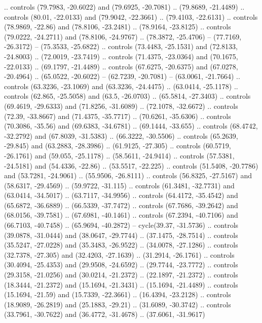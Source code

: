{  .. controls (79.7983, -20.6022) and (79.6925, -20.7081) .. (79.8689, -21.4489)
  .. controls (80.01, -22.0133) and (79.9042, -22.3661) .. (79.4103, -22.6131)
  .. controls (78.9869, -22.86) and (78.8106, -23.2481) .. (78.9164, -23.8125)
  .. controls (79.0222, -24.2711) and (78.8106, -24.9767) .. (78.3872, -25.4706)
  -- (77.7169, -26.3172)
  -- (75.3533, -25.6822)
  .. controls (73.4483, -25.1531) and (72.8133, -24.8003) .. (72.0019, -23.7419)
  .. controls (71.4375, -23.0364) and (70.1675, -22.0133) .. (69.1797, -21.4489)
  .. controls (67.6275, -20.6375) and (67.0278, -20.4964) .. (65.0522, -20.6022)
  -- (62.7239, -20.7081)
  -- (63.0061, -21.7664)
  .. controls (63.3236, -23.1069) and (63.3236, -24.4475) .. (63.0414, -25.1178)
  .. controls (62.865, -25.5058) and (63.5, -26.0703) .. (65.5814, -27.3403)
  .. controls (69.4619, -29.6333) and (71.8256, -31.6089) .. (72.1078, -32.6672)
  .. controls (72.39, -33.8667) and (71.4375, -35.7717) .. (70.6261, -35.6306)
  .. controls (70.3086, -35.56) and (69.6383, -34.6781) .. (69.1444, -33.655)
  .. controls (68.4742, -32.2792) and (67.8039, -31.5383) .. (66.3222, -30.5506)
  .. controls (65.2639, -29.845) and (63.2883, -28.3986) .. (61.9125, -27.305)
  .. controls (60.5719, -26.1761) and (59.055, -25.1178) .. (58.5611, -24.9414)
  .. controls (57.5381, -24.5181) and (54.4336, -22.86) .. (53.5517, -22.225)
  .. controls (51.5408, -20.7786) and (53.7281, -24.9061) .. (55.9506, -26.8111)
  .. controls (56.8325, -27.5167) and (58.6317, -29.4569) .. (59.9722, -31.115)
  .. controls (61.3481, -32.7731) and (63.0414, -34.5017) .. (63.7117, -34.9956)
  .. controls (64.4172, -35.4542) and (65.6872, -36.6889) .. (66.5339, -37.7472)
  .. controls (67.7686, -39.2642) and (68.0156, -39.7581) .. (67.6981, -40.1461)
  .. controls (67.2394, -40.7106) and (66.7103, -40.7458) .. (65.9694, -40.2872)
  -- cycle(39.37, -31.5736)
  .. controls (39.0878, -31.0444) and (38.0647, -29.7744) .. (37.1475, -28.7514)
  .. controls (35.5247, -27.0228) and (35.3483, -26.9522) .. (34.0078, -27.1286)
  .. controls (32.7378, -27.305) and (32.4203, -27.1639) .. (31.2914, -26.1761)
  .. controls (30.4094, -25.4353) and (29.9508, -24.6592) .. (29.7744, -23.7772)
  .. controls (29.3158, -21.0256) and (30.0214, -21.2372) .. (22.1897, -21.2372)
  .. controls (18.3444, -21.2372) and (15.1694, -21.3431) .. (15.1694, -21.4489)
  .. controls (15.1694, -21.59) and (15.7339, -22.3661) .. (16.4394, -23.2128)
  .. controls (18.9089, -26.2819) and (25.1883, -29.21) .. (31.6089, -30.3742)
  .. controls (33.7961, -30.7622) and (36.4772, -31.4678) .. (37.6061, -31.9617)
}

